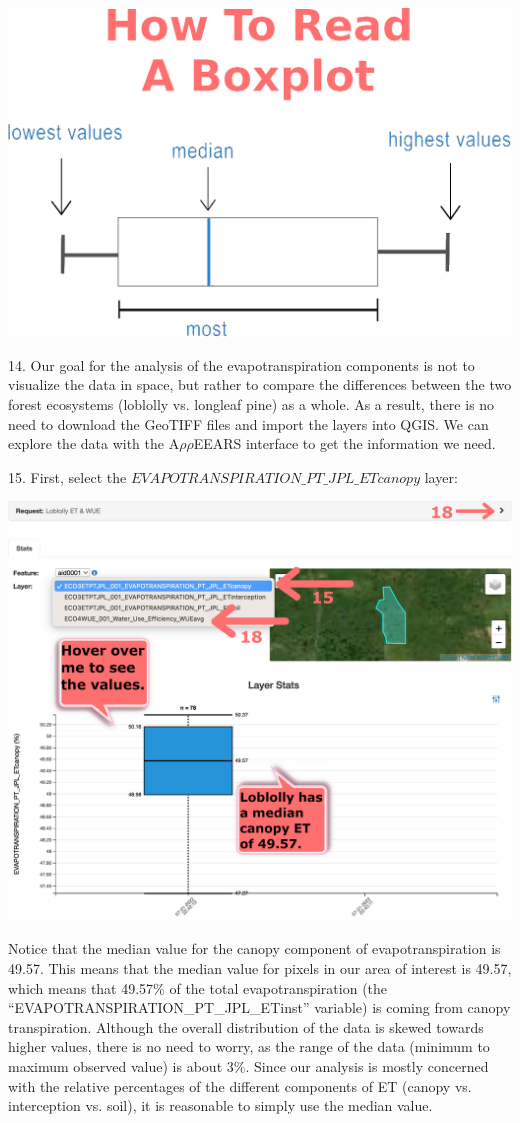 \documentclass[oneside,a4paper,11pt,explicit]{book}
\begin{document}
\vspace{1em}

\centerline{\includegraphics[width=.45\textwidth]{HowToBoxplot.png}}

\vspace{.5em}

14. Our goal for the analysis of the evapotranspiration components is not to visualize the data in space, but rather to compare the differences between the two forest ecosystems (loblolly vs. longleaf pine) as a whole. As a result, there is no need to download the GeoTIFF files and import the layers into QGIS. We can explore the data with the A$\rho\rho$EEARS interface to get the information we need.

15. First, select the $EVAPOTRANSPIRATION\_PT\_JPL\_ETcanopy$ layer:

\vspace{.5em}

\centerline{\includegraphics[width=.6\textwidth]{ETComponents.png}}

\vspace{.5em}

Notice that the median value for the canopy component of evapotranspiration is 49.57. This means that the median value for pixels in our area of interest is 49.57, which means that 49.57\% of the total evapotranspiration (the ``EVAPOTRANSPIRATION\_PT\_JPL\_ETinst'' variable) is coming from canopy transpiration. Although the overall distribution of the data is skewed towards higher values, there is no need to worry, as the range of the data (minimum to maximum observed value) is about 3\%. Since our analysis is mostly concerned with the relative percentages of the different components of ET (canopy vs. interception vs. soil), it is reasonable to simply use the median value.
\end{document}
